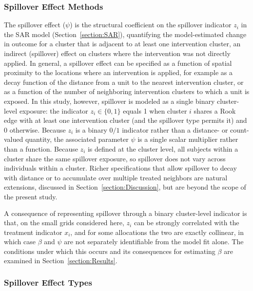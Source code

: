 \documentclass{article}[11pt]
\begin{document}
\subsubsection{Spillover Effect Methods}\label{Section:SpilloverEffectMethods}

The spillover effect ($\psi$) is the structural coefficient on the spillover indicator $z_i$ in the SAR model (Section~\ref{section:SAR}), quantifying the model-estimated change in outcome for a cluster that is adjacent to at least one intervention cluster, an indirect (spillover) effect on clusters where the intervention was not directly applied\cite{benjamin-chung_spillover_2017}\cite{benjamin-chung_extension_2024}. In general, a spillover effect can be specified as a function of spatial proximity to the locations where an intervention is applied, for example as a decay function of the distance from a unit to the nearest intervention cluster, or as a function of the number of neighboring intervention clusters to which a unit is exposed. In this study, however, spillover is modeled as a single binary cluster-level exposure: the indicator $z_i \in \{0,1\}$ equals 1 when cluster $i$ shares a Rook edge with at least one intervention cluster (and the spillover type permits it) and 0 otherwise. Because $z_i$ is a binary $0/1$ indicator rather than a distance- or count-valued quantity, the associated parameter $\psi$ is a single scalar multiplier rather than a function. Because $z_i$ is defined at the cluster level, all subjects within a cluster share the same spillover exposure, so spillover does not vary across individuals within a cluster. Richer specifications that allow spillover to decay with distance or to accumulate over multiple treated neighbors are natural extensions, discussed in Section~\ref{section:Discussion}, but are beyond the scope of the present study.

A consequence of representing spillover through a binary cluster-level indicator is that, on the small grids considered here, $z_i$ can be strongly correlated with the treatment indicator $x_i$, and for some allocations the two are exactly collinear, in which case $\beta$ and $\psi$ are not separately identifiable from the model fit alone. The conditions under which this occurs and its consequences for estimating $\beta$ are examined in Section~\ref{section:Results}.

\subsubsection{Spillover Effect Types}\label{section:SpilloverEffectTypes}
\end{document}
